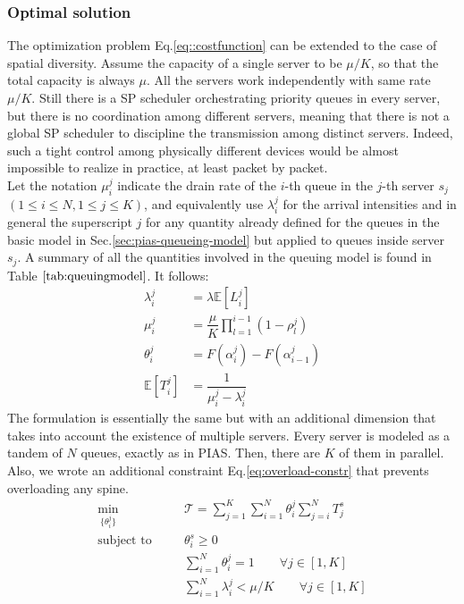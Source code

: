 \subsubsection{Optimal solution}
The optimization problem Eq.\eqref{eq::costfunction} can be extended to the case of spatial diversity.
Assume the capacity of a single server to be $\mu/K$, so that the total capacity is always $\mu$. All the servers work independently with same rate $\mu / K$. Still there is a SP scheduler orchestrating priority queues in every server, but there is no coordination among different servers, meaning that there is not a global SP scheduler to discipline the transmission among distinct servers. Indeed, such a tight control among physically different devices would be almost impossible to realize in practice, at least packet by packet. \\
Let the notation $\mu_i^j$ indicate the drain rate of the $i$-th queue in the $j$-th server $s_j$ $(1 \le i \le N, 1 \le j \le K)$, and equivalently use $\lambda_i^j$ for the arrival intensities and in general the superscript $j$ for any quantity already defined for the queues in the basic model in Sec.\ref{sec:pias-queueing-model} but applied to queues inside server $s_j$. A summary of all the quantities involved in the queuing model is found in Table $\ref{tab:queuingmodel}$. It follows:
\begin{align*}
\lambda_i^j &= \lambda \mathbb{E}[L_i^j] \\
\mu_i^j &=  \dfrac{\mu}{K} \prod_{l=1}^{i-1}(1-\rho_l^j) \\
\theta_i^j &= F(\alpha_i^j) - F(\alpha_{i-1}^j)	\\
\mathbb{E}[T_i^j] &= \dfrac{1}{\mu_i^j - \lambda_i^j}
\end{align*}
The formulation is essentially the same but with an additional dimension that takes into account the existence of multiple servers. Every server is modeled as a tandem of $N$ queues, exactly as in PIAS. Then, there are $K$ of them in parallel. Also, we wrote an additional constraint Eq.\eqref{eq:overload-constr} that prevents overloading any spine.
\begin{subequations}
	\begin{align}
	&\underset{\{\theta_i^j\}}{\text{min}} & \quad  & \mathcal{T} =	\sum_{j=1}^{K}\sum_{i=1}^{N} \theta_i^j \sum_{j=i}^{N}T^s_j 					\label{eq::costfunction-spatial} & \\
	&\text{subject to} & \quad  &\theta_i^s \ge 0 & \\
	& & & \sum_{i=1}^{N} \theta_i^j = 1  \qquad \forall j \in [1,K] &  \\
	& & & \sum_{i=1}^{N}  \lambda_i^j < \mu/K  \qquad \forall j \in [1,K] & \label{eq:overload-constr}
	\end{align}
\end{subequations}
